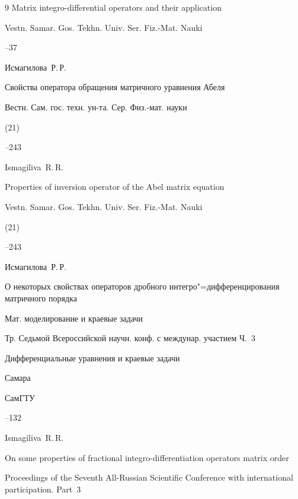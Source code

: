 \begin{thebibliography}{9}
\paper Matrix integro-differential operators and their application

\jour Vestn. Samar. Gos. Tekhn. Univ. Ser. Fiz.-Mat. Nauki



--37






\by Исмагилова~Р.\,Р.

\paper Свойства оператора обращения матричного уравнения Абеля

\jour Вестн. Сам. гос. техн. ун-та. Сер. Физ.-мат. науки


(21)

--243

\misctransl

\by Ismagiliva~R.\,R.

\paper Properties of inversion operator of the Abel matrix equation

\jour Vestn. Samar. Gos. Tekhn. Univ. Ser. Fiz.-Mat. Nauki


(21)

--243




\by Исмагилова~Р.\,Р.

\paper О некоторых свойствах операторов дробного интегро"=дифференцирования матричного порядка

\serial Мат. моделирование и краевые задачи

\inbook Тр. Седьмой Всероссийской научн. конф. с междунар. участием \rm Ч.~{\rm 3}

\bookinfo Дифференциальные уравнения и краевые задачи

\publaddr Самара

\publ СамГТУ


--132

\misctransl

\by Ismagiliva~R.\,R.

\paper On some properties of fractional integro-differentiation operators  matrix order

\inbook Proceedings of the Seventh  All-Russian Scientific Conference with international participation. \rm  Part~3


\end{thebibliography}
